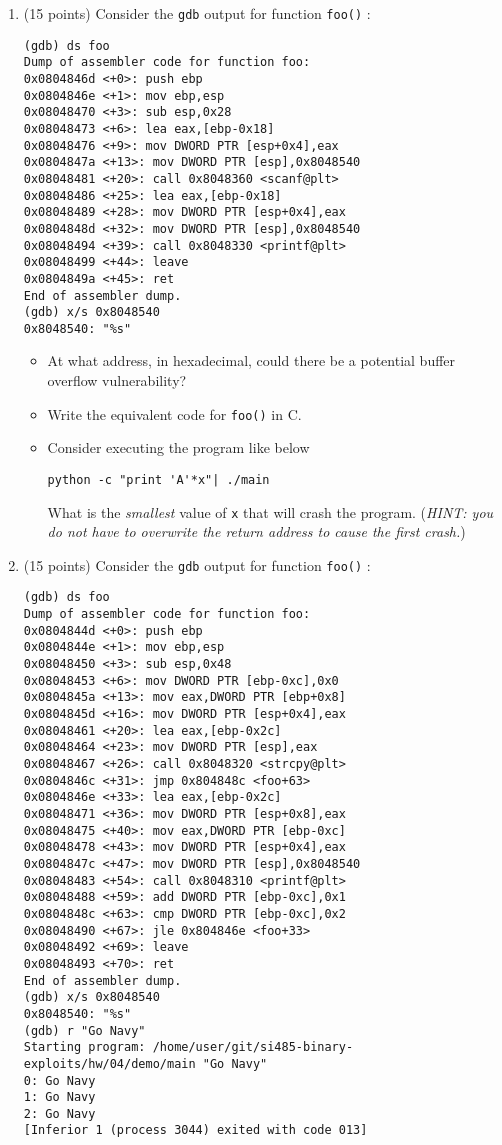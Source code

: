 \documentclass{article}[9pt]
\begin{document}
\begin{enumerate}
\item (15 points) Consider the \texttt{gdb} output for function \texttt{foo()} :

\begin{verbatim}
(gdb) ds foo
Dump of assembler code for function foo:
0x0804846d <+0>: push ebp
0x0804846e <+1>: mov ebp,esp
0x08048470 <+3>: sub esp,0x28
0x08048473 <+6>: lea eax,[ebp-0x18]
0x08048476 <+9>: mov DWORD PTR [esp+0x4],eax
0x0804847a <+13>: mov DWORD PTR [esp],0x8048540
0x08048481 <+20>: call 0x8048360 <scanf@plt>
0x08048486 <+25>: lea eax,[ebp-0x18]
0x08048489 <+28>: mov DWORD PTR [esp+0x4],eax
0x0804848d <+32>: mov DWORD PTR [esp],0x8048540
0x08048494 <+39>: call 0x8048330 <printf@plt>
0x08048499 <+44>: leave
0x0804849a <+45>: ret
End of assembler dump.
(gdb) x/s 0x8048540
0x8048540: "%s"
\end{verbatim}

\begin{itemize}
\item At what address, in hexadecimal, could there be a potential buffer overflow vulnerability?

\item Write the equivalent code for \texttt{foo()} in C.

\item Consider executing the program like below
\begin{verbatim}
python -c "print 'A'*x"| ./main
\end{verbatim}
What is the \emph{smallest} value of \texttt{x} that will crash the
program. (\emph{HINT: you do not have to overwrite the return
address to cause the first crash.})
\end{itemize}

\item (15 points) Consider the \texttt{gdb} output for function \texttt{foo()} :

\begin{verbatim}
(gdb) ds foo
Dump of assembler code for function foo:
0x0804844d <+0>: push ebp
0x0804844e <+1>: mov ebp,esp
0x08048450 <+3>: sub esp,0x48
0x08048453 <+6>: mov DWORD PTR [ebp-0xc],0x0
0x0804845a <+13>: mov eax,DWORD PTR [ebp+0x8]
0x0804845d <+16>: mov DWORD PTR [esp+0x4],eax
0x08048461 <+20>: lea eax,[ebp-0x2c]
0x08048464 <+23>: mov DWORD PTR [esp],eax
0x08048467 <+26>: call 0x8048320 <strcpy@plt>
0x0804846c <+31>: jmp 0x804848c <foo+63>
0x0804846e <+33>: lea eax,[ebp-0x2c]
0x08048471 <+36>: mov DWORD PTR [esp+0x8],eax
0x08048475 <+40>: mov eax,DWORD PTR [ebp-0xc]
0x08048478 <+43>: mov DWORD PTR [esp+0x4],eax
0x0804847c <+47>: mov DWORD PTR [esp],0x8048540
0x08048483 <+54>: call 0x8048310 <printf@plt>
0x08048488 <+59>: add DWORD PTR [ebp-0xc],0x1
0x0804848c <+63>: cmp DWORD PTR [ebp-0xc],0x2
0x08048490 <+67>: jle 0x804846e <foo+33>
0x08048492 <+69>: leave
0x08048493 <+70>: ret
End of assembler dump.
(gdb) x/s 0x8048540
0x8048540: "%s"
(gdb) r "Go Navy"
Starting program: /home/user/git/si485-binary-exploits/hw/04/demo/main "Go Navy"
0: Go Navy
1: Go Navy
2: Go Navy
[Inferior 1 (process 3044) exited with code 013]
\end{verbatim}


\end{enumerate}
\end{document}
